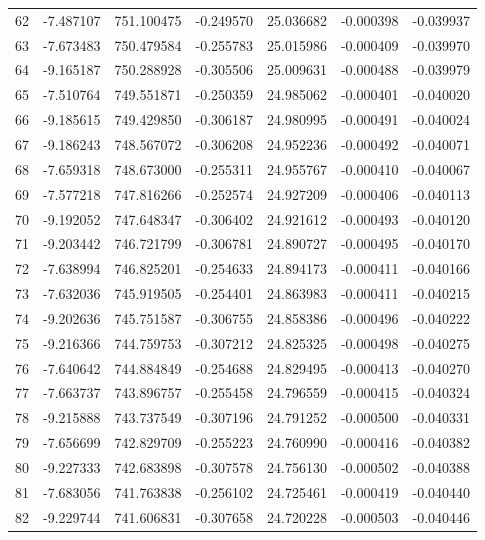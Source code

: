 \begin{tabular}{rrrrrrr}
  62 &  -7.487107 &  751.100475 & -0.249570 &   25.036682 &   -0.000398 & -0.039937 \\
  63 &  -7.673483 &  750.479584 & -0.255783 &   25.015986 &   -0.000409 & -0.039970 \\
  64 &  -9.165187 &  750.288928 & -0.305506 &   25.009631 &   -0.000488 & -0.039979 \\
  65 &  -7.510764 &  749.551871 & -0.250359 &   24.985062 &   -0.000401 & -0.040020 \\
  66 &  -9.185615 &  749.429850 & -0.306187 &   24.980995 &   -0.000491 & -0.040024 \\
  67 &  -9.186243 &  748.567072 & -0.306208 &   24.952236 &   -0.000492 & -0.040071 \\
  68 &  -7.659318 &  748.673000 & -0.255311 &   24.955767 &   -0.000410 & -0.040067 \\
  69 &  -7.577218 &  747.816266 & -0.252574 &   24.927209 &   -0.000406 & -0.040113 \\
  70 &  -9.192052 &  747.648347 & -0.306402 &   24.921612 &   -0.000493 & -0.040120 \\
  71 &  -9.203442 &  746.721799 & -0.306781 &   24.890727 &   -0.000495 & -0.040170 \\
  72 &  -7.638994 &  746.825201 & -0.254633 &   24.894173 &   -0.000411 & -0.040166 \\
  73 &  -7.632036 &  745.919505 & -0.254401 &   24.863983 &   -0.000411 & -0.040215 \\
  74 &  -9.202636 &  745.751587 & -0.306755 &   24.858386 &   -0.000496 & -0.040222 \\
  75 &  -9.216366 &  744.759753 & -0.307212 &   24.825325 &   -0.000498 & -0.040275 \\
  76 &  -7.640642 &  744.884849 & -0.254688 &   24.829495 &   -0.000413 & -0.040270 \\
  77 &  -7.663737 &  743.896757 & -0.255458 &   24.796559 &   -0.000415 & -0.040324 \\
  78 &  -9.215888 &  743.737549 & -0.307196 &   24.791252 &   -0.000500 & -0.040331 \\
  79 &  -7.656699 &  742.829709 & -0.255223 &   24.760990 &   -0.000416 & -0.040382 \\
  80 &  -9.227333 &  742.683898 & -0.307578 &   24.756130 &   -0.000502 & -0.040388 \\
  81 &  -7.683056 &  741.763838 & -0.256102 &   24.725461 &   -0.000419 & -0.040440 \\
  82 &  -9.229744 &  741.606831 & -0.307658 &   24.720228 &   -0.000503 & -0.040446 \\

\end{tabular}

